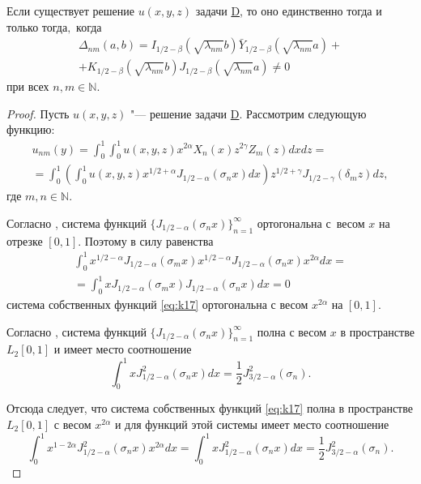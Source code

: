 \smallskip


\begin{theorem}[1]Если существует решение $u(x,y,z)$ задачи \hyperlink{task:D}{D}{\rm,} то оно единственно тогда и только тогда$,$ когда
\begin{multline}
\Delta_{nm}(a,b)=I_{ 1/2 -\beta}(\sqrt{\lambda_{nm}}b)\bar Y_{ 1/2 -\beta}(\sqrt{\lambda_{nm}}a)+ 
\\
+K_{ 1/2 -\beta}(\sqrt{\lambda_{nm}}b)J_{ 1/2 -\beta}(\sqrt{\lambda_{nm}}a) \ne 0
\label{eq:k23}
\end{multline}
при всех $n,m \in \mathbb N.$
\end{theorem}

\smallskip

\begin{proof} Пусть $u(x,y,z)$ "--- решение задачи \hyperlink{task:D}{D}. 
Рассмотрим следующую функцию:
\begin{multline}
u_{nm}(y)=\int_0^1{\int_0^1{u(x,y,z)x^{2\alpha}X_n(x)z^{2\gamma}Z_m(z)dxdz}}= 
\\
=\int_0^1{\left(\int_0^1{u(x,y,z)x^{ 1/2 +\alpha}J_{ 1/2 -\alpha}(\sigma_n x)dx}\right)z^{ 1/2 +\gamma} J_{ 1/2 -\gamma}(\delta_m z)dz,}
\label{eq:k24}
\end{multline}
где $ m,n \in \mathbb  N.$
	
Согласно \cite[\S 15.25]{uk:bib:Vatson}, система функций $\{J_{ 1/2 -\alpha}(\sigma_n x)\}_{n=1}^\infty$ ортогональна с~весом $x$ на отрезке $[0, 1].$
Поэтому в силу равенства
\begin{multline}
\int_0^1{x^{ 1/2 -\alpha}J_{ 1/2 -\alpha}(\sigma_m x)x^{ 1/2 -\alpha}J_{ 1/2 -\alpha}(\sigma_n x)x^{2\alpha}dx}=
\\
=\int_0^1{xJ_{ 1/2 -\alpha}(\sigma_m x)J_{ 1/2 -\alpha}(\sigma_n x)dx}=0
\label{eq:k25}
\end{multline}
система собственных функций \eqref{eq:k17} ортогональна с весом $x^{2\alpha}$  на $[0,1].$

Согласно \cite[\S 18.1]{uk:bib:Vatson}, система функций
$
\{J_{ 1/2 -\alpha}(\sigma_n x)\}_{n=1}^\infty
$
полна с весом $x$ в пространстве $L_2[0, 1]$ и имеет место соотношение
$$
\int_0^1{xJ_{ 1/2 -\alpha}^2(\sigma_n x)dx}=\frac{1}{2}J_{3/2-\alpha}^2(\sigma_n).
$$

Отсюда следует, что система собственных функций \eqref{eq:k17} полна в пространстве $L_2[0,1]$ с весом $x^{2\alpha} $ и для функций этой системы имеет место соотношение
\begin{equation}
\int_0^1{x^{1-2\alpha}J_{ 1/2 -\alpha}^2(\sigma_n x)x^{2\alpha}dx}=
\int_0^1{xJ_{ 1/2 -\alpha}^2(\sigma_n x)dx}=\frac{1}{2}J_{3/2-\alpha}^2(\sigma_n).
\label{eq:k26}
\end{equation}


\end{proof}
